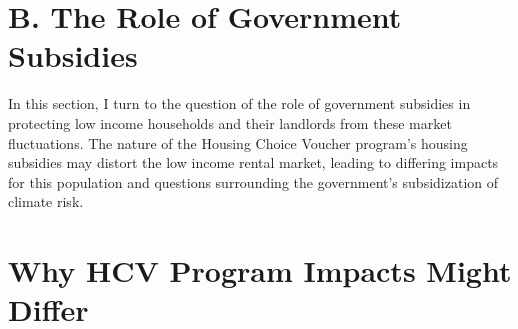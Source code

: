 \documentclass[12pt]{article}
\begin{document}
{{{{{%




\section*{B. The Role of Government Subsidies}
In this section, I turn to the question of the role of government subsidies in protecting low income households and their landlords from these market fluctuations.  The nature of the Housing Choice Voucher program's housing subsidies may distort the low income rental market, leading to differing impacts for this population and questions surrounding the government's subsidization of climate risk.

\section{Why HCV Program Impacts Might Differ}{\label{sec:incidence}}

}}}}}
\end{document}

